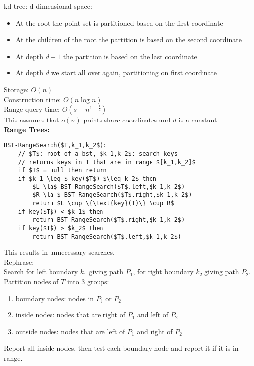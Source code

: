 \documentclass[12pt]{article}
\newcommand{\la}{\leftarrow}
\begin{document}
{kd-tree: d-dimensional space:
\begin{itemize}
	\renewcommand\labelitemi{--}
	\item At the root the point set is partitioned based on the first coordinate
	\item At the children of the root the partition is based on the second coordinate
	\item At depth $d-1$ the partition is based on the last coordinate
	\item At depth $d$ we start all over again, partitioning on first coordinate
\end{itemize}
Storage: $O(n)$\\
Construction time: $O(n \log n)$\\
Range query time: $O(s + n^{1-\frac{1}{d}})$\\
This assumes that $o(n)$ points share coordinates and $d$ is a constant.\\

\textbf{Range Trees:}
\begin{lstlisting}[mathescape=true]
BST-RangeSearch($T,k_1,k_2$):
	// $T$: root of a bst, $k_1,k_2$: search keys
    // returns keys in T that are in range $[k_1,k_2]$
    if $T$ = null then return
    if $k_1 \leq $ key($T$) $\leq k_2$ then 
    	$L \la$ BST-RangeSearch($T$.left,$k_1,k_2$)
    	$R \la $ BST-RangeSearch($T$.right,$k_1,k_2$)
    	return $L \cup \{\text{key}(T)\} \cup R$
    if key($T$) < $k_1$ then
    	return BST-RangeSearch($T$.right,$k_1,k_2$)
    if key($T$) > $k_2$ then
    	return BST-RangeSearch($T$.left,$k_1,k_2$)
\end{lstlisting}
This results in unnecessary searches.\\
Rephrase:\\
Search for left boundary $k_1$ giving path $P_1$, for right boundary $k_2$ giving path $P_2$. \\
Partition nodes of $T$ into 3 groups: 
\begin{enumerate}
	\item boundary nodes: nodes in $P_1$ or $P_2$
    \item inside nodes: nodes that are right of $P_1$ and left of $P_2$
    \item outside nodes: nodes that are left of $P_1$ and right of $P_2$
\end{enumerate}
Report all inside nodes, then test each boundary node and report it if it is in range. \\

}
\end{document}

